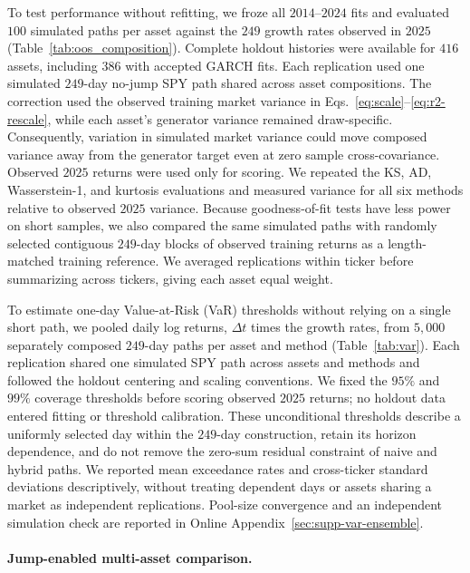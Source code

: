 To test performance without refitting, we froze all $2014$--$2024$
fits and evaluated $100$ simulated paths per asset against the $249$
growth rates observed in $2025$ (Table~\ref{tab:oos_composition}).
Complete holdout histories were available for $416$ assets, including
$386$ with accepted GARCH fits. Each replication used one simulated
$249$-day no-jump SPY path shared across asset compositions. The
correction used the observed training market variance in
Eqs.~\eqref{eq:scale}--\eqref{eq:r2-rescale}, while each asset's
generator variance remained draw-specific. Consequently, variation
in simulated market variance could move composed variance away from
the generator target even at zero sample cross-covariance. Observed
$2025$ returns were used only for scoring. We repeated the KS, AD,
Wasserstein-1, and kurtosis evaluations and measured variance for all
six methods relative to observed $2025$ variance. Because goodness-of-fit tests have less power on short samples, we
also compared the same simulated paths with randomly selected
contiguous $249$-day blocks of observed training returns as a
length-matched training reference. We averaged
replications within ticker before summarizing across tickers, giving
each asset equal weight.

To estimate one-day Value-at-Risk (VaR) thresholds without relying on
a single short path, we pooled daily log returns, $\Delta t$ times
the growth rates, from $5{,}000$ separately composed $249$-day paths
per asset and method (Table~\ref{tab:var}). Each replication shared
one simulated SPY path across assets and methods and followed the
holdout centering and scaling conventions. We fixed the $95\%$ and
$99\%$ coverage thresholds before scoring observed $2025$ returns;
no holdout data entered fitting or threshold calibration. These
unconditional thresholds describe a uniformly selected day within the
$249$-day construction, retain its horizon dependence, and do not
remove the zero-sum residual constraint of naive and hybrid paths.
We reported mean exceedance rates and cross-ticker standard deviations
descriptively, without treating dependent days or assets sharing a
market as independent replications. Pool-size convergence and an
independent simulation check are reported in Online
Appendix~\ref{sec:supp-var-ensemble}.


\paragraph{Jump-enabled multi-asset comparison.}

